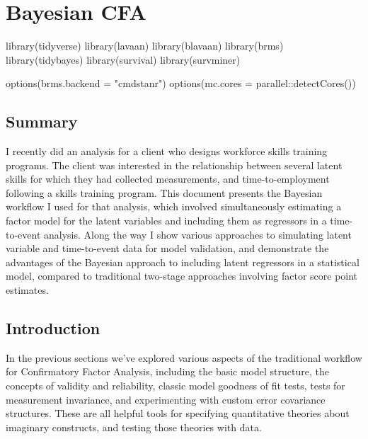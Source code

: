 \documentclass[
  letterpaper,
  DIV=11,
  numbers=noendperiod]{scrreprt}
\newenvironment{Shaded}{\begin{snugshade}}{\end{snugshade}}
\newcommand{\AttributeTok}[1]{\textcolor[rgb]{0.40,0.45,0.13}{#1}}
\newcommand{\FunctionTok}[1]{\textcolor[rgb]{0.28,0.35,0.67}{#1}}
\newcommand{\NormalTok}[1]{\textcolor[rgb]{0.00,0.23,0.31}{#1}}
\newcommand{\SpecialCharTok}[1]{\textcolor[rgb]{0.37,0.37,0.37}{#1}}
\newcommand{\StringTok}[1]{\textcolor[rgb]{0.13,0.47,0.30}{#1}}
\begin{document}
\hypertarget{bayesian-cfa}{%
\chapter{Bayesian CFA}\label{bayesian-cfa}}

\begin{Shaded}
\begin{Highlighting}[]
\FunctionTok{library}\NormalTok{(tidyverse)}
\FunctionTok{library}\NormalTok{(lavaan)}
\FunctionTok{library}\NormalTok{(blavaan)}
\FunctionTok{library}\NormalTok{(brms)}
\FunctionTok{library}\NormalTok{(tidybayes)}
\FunctionTok{library}\NormalTok{(survival)}
\FunctionTok{library}\NormalTok{(survminer)}

\FunctionTok{options}\NormalTok{(}\AttributeTok{brms.backend =} \StringTok{"cmdstanr"}\NormalTok{)}
\FunctionTok{options}\NormalTok{(}\AttributeTok{mc.cores =}\NormalTok{ parallel}\SpecialCharTok{::}\FunctionTok{detectCores}\NormalTok{())}
\end{Highlighting}
\end{Shaded}

\hypertarget{summary}{%
\section*{Summary}\label{summary}}

I recently did an analysis for a client who designs workforce skills
training programs. The client was interested in the relationship between
several latent skills for which they had collected measurements, and
time-to-employment following a skills training program. This document
presents the Bayesian workflow I used for that analysis, which involved
simultaneously estimating a factor model for the latent variables and
including them as regressors in a time-to-event analysis. Along the way
I show various approaches to simulating latent variable and
time-to-event data for model validation, and demonstrate the advantages
of the Bayesian approach to including latent regressors in a statistical
model, compared to traditional two-stage approaches involving factor
score point estimates.

\hypertarget{introduction}{%
\section{Introduction}\label{introduction}}

In the previous sections we've explored various aspects of the
traditional workflow for Confirmatory Factor Analysis, including the
basic model structure, the concepts of validity and reliability, classic
model goodness of fit tests, tests for measurement invariance, and
experimenting with custom error covariance structures. These are all
helpful tools for specifying quantitative theories about imaginary
constructs, and testing those theories with data.
\end{document}
